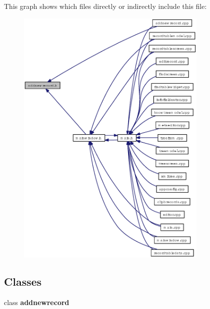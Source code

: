 This graph shows which files directly or indirectly include this file:\begin{figure}[H]
\begin{center}
\leavevmode
\includegraphics[width=261pt]{addnewrecord_8h__dep__incl}
\end{center}
\end{figure}
\subsection*{Classes}
\begin{CompactItemize}
\item 
class {\bf addnewrecord}
\end{CompactItemize}
